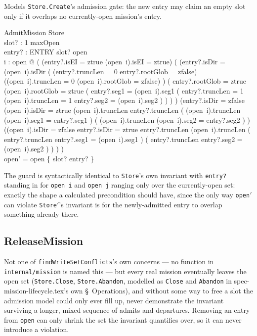 \documentclass[a4paper,10pt,fleqn]{article}
\newcommand{\fpath}[1]{\texttt{#1}}
\newcommand{\field}[1]{\texttt{#1}}
\begin{document}
Models \field{Store.Create}'s admission gate: the new entry may claim
an empty slot only if it overlaps no currently-open mission's entry.

\begin{schema}{AdmitMission}
\Delta Store \\
slot? : 1 \upto maxOpen \\
entry? : ENTRY
\where
slot? \notin \dom open \\
\forall i : \dom open @
  \lnot ( \lnot (entry?.isEI = ztrue \land (open\ i).isEI = ztrue) \land
    ( (entry?.isDir = (open\ i).isDir \land
        \lnot ( (entry?.truncLen = 0 \land entry?.rootGlob = zfalse)
                \lor ((open\ i).truncLen = 0 \land (open\ i).rootGlob = zfalse) ) \land
        ( entry?.rootGlob = ztrue \lor (open\ i).rootGlob = ztrue
          \lor ( entry?.seg1 = (open\ i).seg1 \land
                ( entry?.truncLen = 1 \lor (open\ i).truncLen = 1
                  \lor entry?.seg2 = (open\ i).seg2 ) ) ) )
      \lor (entry?.isDir = zfalse \land (open\ i).isDir = ztrue \land
        (open\ i).truncLen \leq entry?.truncLen \land
        ( (open\ i).truncLen  \implies (open\ i).seg1 = entry?.seg1 ) \land
        ( (open\ i).truncLen  \implies (open\ i).seg2 = entry?.seg2 ) )
      \lor ((open\ i).isDir = zfalse \land entry?.isDir = ztrue \land
        entry?.truncLen \leq (open\ i).truncLen \land
        ( entry?.truncLen  \implies entry?.seg1 = (open\ i).seg1 ) \land
        ( entry?.truncLen  \implies entry?.seg2 = (open\ i).seg2 ) ) ) ) \\
open' = open \oplus \{ slot? \mapsto entry? \}
\end{schema}

The guard is syntactically identical to \field{Store}'s own
invariant with \field{entry?} standing in for \field{open\ i} and
\field{open\ j} ranging only over the currently-open set: exactly the
shape a calculated precondition should have, since the only way
\field{open}$'$ can violate \field{Store}$'$'s invariant is for the
newly-admitted entry to overlap something already there.

\subsection{ReleaseMission}

Not one of \field{findWriteSetConflicts}'s own concerns --- no
function in \fpath{internal/mission} is named this --- but every real
mission eventually leaves the open set (\field{Store.Close},
\field{Store.Abandon}, modelled as \field{Close} and \field{Abandon}
in spec-mission-lifecycle.tex's own \S~Operations), and without some
way to
free a slot the admission model could only ever fill up, never
demonstrate the invariant surviving a longer, mixed sequence of
admits and departures. Removing an entry from \field{open} can only
shrink the set the invariant quantifies over, so it can never
introduce a violation.
\end{document}
